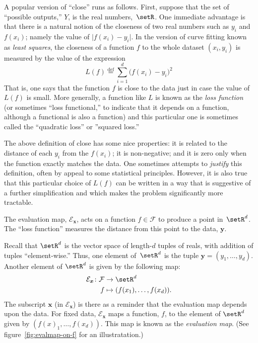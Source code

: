 \documentclass[10pt, a4paper]{article}
\newcommand{\isdef}{\stackrel{\text{def}}{=}}
\begin{document}
A popular version of “close” runs as follows. First, suppose that the
set of “possible outputs,” $Y$, is the real
numbers,~$\setR$. One immediate advantage is that there
is a natural notion of the closeness of two real numbers such as $y_i$
and $f(x_i)$; namely the value of $\lvert f(x_i)-y_i\rvert$. In the
version of curve fitting known as \emph{least squares}, the closeness
of a function $f$ to the whole dataset $(x_i, y_i)$ is measured by the
value of the expression
\begin{equation}
  \label{eq:least-squares-sum}
  L(f) \isdef \sum_{i=1}^d {\bigl(f(x_i)-y_i\bigr)}^2  
\end{equation}
That is, one says that the function $f$ is close to the data just in
case the value of $L(f)$ is small. More generally, a function like $L$
is known as the \emph{loss function} (or sometimes “loss functional,”
to indicate that it depends on a function, although a functional is
also a function) and this particular one is sometimes called the
“quadratic loss” or ”squared loss.”

The above definition of close has some nice properties: it is related
to the distance of each $y_i$ from the $f(x_i)$; it is non-negative;
and it is zero only when the function exactly matches the data. One
sometimes attempts to \emph{justify} this definition, often by appeal
to some statistical principles. However, it is also true that this
particular choice of $L(f)$ can be written in a way that is suggestive
of a further simplification and which makes the problem significantly
more tractable. 

\begin{marginfigure}
  \begin{center}
  \end{center}
  \caption{The evaluation map, $\mathcal{E}_{\bm{x}}$, acts on a function
    $f\in\mathcal{F}$ to produce a point in~$\setR^d$. The “loss function”
    measures the distance from this point to the data, 
    $\bm{y}$.\label{fig:evalmap-on-f}}
\end{marginfigure}
Recall that $\setR^d$ is the vector space of length-$d$ tuples of
reals, with addition of tuples “element-wise.” Thus, one element
of~$\setR^d$ is the tuple $\bm{y}=(y_1,\dotsc,y_d)$. Another element
of $\setR^d$ is given by the following map:
\[
  \begin{aligned}
    \mathcal{E}_{\bm{x}} \colon \mathcal{F} &\to \setR^d \\
    f &\mapsto (f(x_1), \dotsc, f(x_d)).
  \end{aligned}
\]
The subscript $\bm{x}$ (in $\mathcal{E}_{\bm{x}}$) is there as a reminder that
the evaluation map depends upon the data. For fixed data,
$\mathcal{E}_{\bm{x}}$ maps a function, $f$, to the element of
$\setR^d$ given by $(f(x)_1, \dotsc, f(x_d))$. This map is known as
the \emph{evaluation map}. (See figure~\ref{fig:evalmap-on-f} for an
illustratation.)
\end{document}
